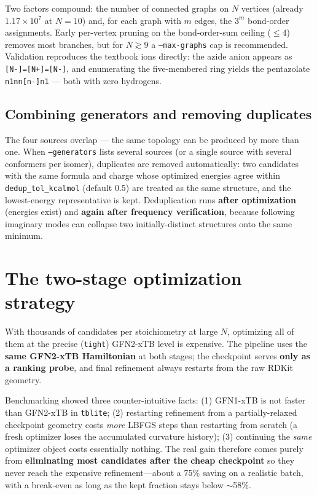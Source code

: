 \documentclass[11pt,a4paper]{article}
\begin{document}
\begin{finding}
Two factors compound: the number of connected graphs on $N$ vertices (already
$1.17\times10^{7}$ at $N=10$) and, for each graph with $m$ edges, the
$3^{m}$ bond-order assignments. Early per-vertex pruning on the
bond-order-sum ceiling ($\le 4$) removes most branches, but for $N \gtrsim 9$
a \texttt{--max-graphs} cap is recommended. Validation reproduces the
textbook ions directly: the azide anion appears as
\texttt{[N-]=[N+]=[N-]}, and enumerating the five-membered ring yields the
pentazolate \texttt{n1nn[n-]n1} --- both with zero hydrogens.
\end{finding}

\subsection{Combining generators and removing duplicates}
\label{sec:dedup}

The four sources overlap --- the same topology can be produced by more than
one. When \texttt{--generators} lists several sources (or a single source
with several conformers per isomer), duplicates are removed automatically:
two candidates with the same formula and charge whose optimized energies
agree within \texttt{dedup\_tol\_kcalmol} (default 0.5) are treated as the
same structure, and the lowest-energy representative is kept. Deduplication
runs \textbf{after optimization} (energies exist) and \textbf{again after
frequency verification}, because following imaginary modes can collapse two
initially-distinct structures onto the same minimum.



\section{The two-stage optimization strategy}
\label{sec:checkpoint}

With thousands of candidates per stoichiometry at large $N$, optimizing all
of them at the precise (\texttt{tight}) GFN2-xTB level is expensive. The
pipeline uses the \textbf{same GFN2-xTB Hamiltonian} at both stages; the
checkpoint serves \textbf{only as a ranking probe}, and final refinement
always restarts from the raw RDKit geometry.

\begin{finding}
Benchmarking showed three counter-intuitive facts: (1) GFN1-xTB is not
faster than GFN2-xTB in \texttt{tblite}; (2) restarting refinement from a
partially-relaxed checkpoint geometry costs \emph{more} LBFGS steps than
restarting from scratch (a fresh optimizer loses the accumulated curvature
history); (3) continuing the \emph{same} optimizer object costs essentially
nothing. The real gain therefore comes purely from \textbf{eliminating most
candidates after the cheap checkpoint} so they never reach the expensive
refinement---about a 75\% saving on a realistic batch, with a break-even as
long as the kept fraction stays below $\sim$58\%.
\end{finding}
\end{document}
